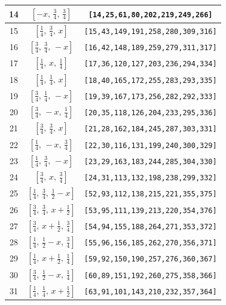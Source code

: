 \documentclass[fleqn,8pt]{jsarticle}
\begin{document}
\begin{longtable}{ccc}
14 & $\left[ - x,\, \frac{3}{4},\, \frac{3}{4} \right]$ & {\tt [14,25,61,80,202,219,249,266]} \\ \hline
15 & $\left[ \frac{1}{4},\, \frac{3}{4},\, x \right]$ & {\tt [15,43,149,191,258,280,309,316]} \\ \hline
16 & $\left[ \frac{3}{4},\, \frac{3}{4},\, - x \right]$ & {\tt [16,42,148,189,259,279,311,317]} \\ \hline
17 & $\left[ \frac{1}{4},\, x,\, \frac{1}{4} \right]$ & {\tt [17,36,120,127,203,236,294,334]} \\ \hline
18 & $\left[ \frac{1}{4},\, \frac{1}{4},\, x \right]$ & {\tt [18,40,165,172,255,283,293,335]} \\ \hline
19 & $\left[ \frac{3}{4},\, \frac{1}{4},\, - x \right]$ & {\tt [19,39,167,173,256,282,292,333]} \\ \hline
20 & $\left[ \frac{3}{4},\, - x,\, \frac{1}{4} \right]$ & {\tt [20,35,118,126,204,233,295,336]} \\ \hline
21 & $\left[ \frac{3}{4},\, \frac{3}{4},\, x \right]$ & {\tt [21,28,162,184,245,287,303,331]} \\ \hline
22 & $\left[ \frac{1}{4},\, - x,\, \frac{3}{4} \right]$ & {\tt [22,30,116,131,199,240,300,329]} \\ \hline
23 & $\left[ \frac{1}{4},\, \frac{3}{4},\, - x \right]$ & {\tt [23,29,163,183,244,285,304,330]} \\ \hline
24 & $\left[ \frac{3}{4},\, x,\, \frac{3}{4} \right]$ & {\tt [24,31,113,132,198,238,299,332]} \\ \hline
25 & $\left[ \frac{1}{4},\, \frac{3}{4},\, \frac{1}{2} - x \right]$ & {\tt [52,93,112,138,215,221,355,375]} \\ \hline
26 & $\left[ \frac{3}{4},\, \frac{3}{4},\, x + \frac{1}{2} \right]$ & {\tt [53,95,111,139,213,220,354,376]} \\ \hline
27 & $\left[ \frac{3}{4},\, x + \frac{1}{2},\, \frac{3}{4} \right]$ & {\tt [54,94,155,188,264,271,353,372]} \\ \hline
28 & $\left[ \frac{1}{4},\, \frac{1}{2} - x,\, \frac{3}{4} \right]$ & {\tt [55,96,156,185,262,270,356,371]} \\ \hline
29 & $\left[ \frac{1}{4},\, x + \frac{1}{2},\, \frac{1}{4} \right]$ & {\tt [59,92,150,190,257,276,360,367]} \\ \hline
30 & $\left[ \frac{3}{4},\, \frac{1}{2} - x,\, \frac{1}{4} \right]$ & {\tt [60,89,151,192,260,275,358,366]} \\ \hline
31 & $\left[ \frac{1}{4},\, \frac{1}{4},\, x + \frac{1}{2} \right]$ & {\tt [63,91,101,143,210,232,357,364]} \\ \hline

\end{longtable}
\end{document}
